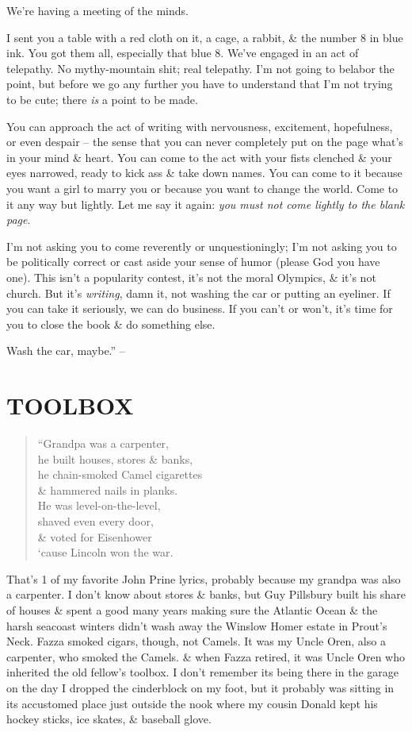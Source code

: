 \documentclass{article}
\numberwithin{equation}{section}
\begin{document}
We're having a meeting of the minds.

I sent you a table with a red cloth on it, a cage, a rabbit, \& the number 8 in blue ink. You got them all, especially that blue 8. We've engaged in an act of telepathy. No mythy-mountain shit; real telepathy. I'm not going to belabor the point, but before we go any further you have to understand that I'm not trying to be cute; there \textit{is} a point to be made.

You can approach the act of writing with nervousness, excitement, hopefulness, or even despair -- the sense that you can never completely put on the page what's in your mind \& heart. You can come to the act with your fists clenched \& your eyes narrowed, ready to kick ass \& take down names. You can come to it because you want a girl to marry you or because you want to change the world. Come to it any way but lightly. Let me say it again: \textit{you must not come lightly to the blank page}.

I'm not asking you to come reverently or unquestioningly; I'm not asking you to be politically correct or cast aside your sense of humor (please God you have one). This isn't a popularity contest, it's not the moral Olympics, \& it's not church. But it's \textit{writing}, damn it, not washing the car or putting an eyeliner. If you can take it seriously, we can do business. If you can't or won't, it's time for you to close the book \& do something else.

Wash the car, maybe.'' -- \cite[pp. 83--85]{King2010}


\section{TOOLBOX}

\begin{quotation}
	``Grandpa was a carpenter,\\he built houses, stores \& banks,\\he chain-smoked Camel cigarettes\\\& hammered nails in planks.\\He was level-on-the-level,\\shaved even every door,\\\& voted for Eisenhower\\`cause Lincoln won the war.
\end{quotation}
That's 1 of my favorite John Prine lyrics, probably because my grandpa was also a carpenter. I don't know about stores \& banks, but Guy Pillsbury built his share of houses \& spent a good many years making sure the Atlantic Ocean \& the harsh seacoast winters didn't wash away the Winslow Homer estate in Prout's Neck. Fazza smoked cigars, though, not Camels. It was my Uncle Oren, also a carpenter, who smoked the Camels. \& when Fazza retired, it was Uncle Oren who inherited the old fellow's toolbox. I don't remember its being there in the garage on the day I dropped the cinderblock on my foot, but it probably was sitting in its accustomed place just outside the nook where my cousin Donald kept his hockey sticks, ice skates, \& baseball glove.
\end{document}
